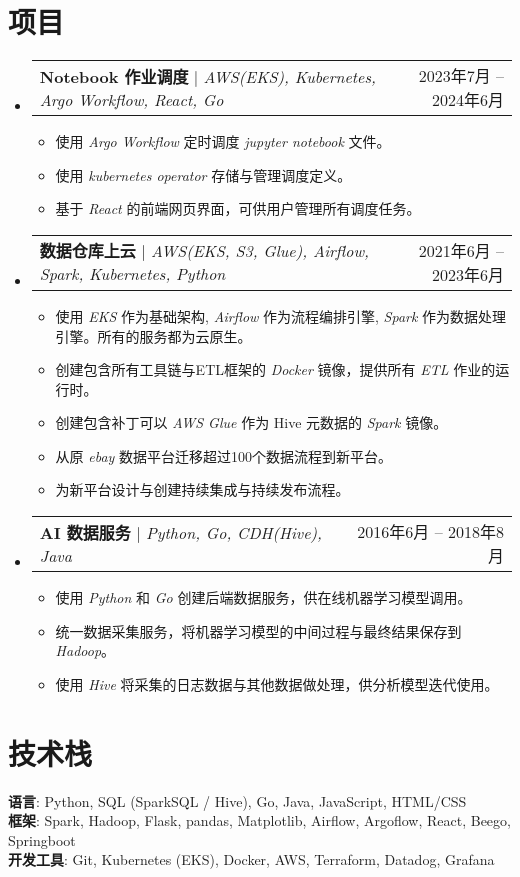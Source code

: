 \documentclass[a4paper,11pt]{article}
\makeatletter
\newcommand{\resumeItem}[1]{
  \item\small{
    {#1 \vspace{-2pt}}
  }
}
\newcommand{\resumeProjectHeading}[2]{
    \item
    \begin{tabular*}{0.97\textwidth}{l@{\extracolsep{\fill}}r}
      \small#1 & #2 \\
    \end{tabular*}\vspace{-7pt}
}
\newcommand{\resumeSubHeadingListStart}{\begin{itemize}[leftmargin=0.15in, label={}]}
\newcommand{\resumeSubHeadingListEnd}{\end{itemize}}
\newcommand{\resumeItemListStart}{\begin{itemize}}
\newcommand{\resumeItemListEnd}{\end{itemize}\vspace{-5pt}}
\makeatother
\begin{document}
\section{项目}
    \resumeSubHeadingListStart
      \resumeProjectHeading
          {\textbf{Notebook 作业调度} $|$ \emph{AWS(EKS), Kubernetes, Argo Workflow, React, Go}}{2023年7月 -- 2024年6月}
          \resumeItemListStart
            \resumeItem{使用 \emph{Argo Workflow} 定时调度 \emph{jupyter notebook} 文件。}
            \resumeItem{使用 \emph{kubernetes operator} 存储与管理调度定义。}
            \resumeItem{基于 \emph{React} 的前端网页界面，可供用户管理所有调度任务。}
          \resumeItemListEnd
      \resumeProjectHeading
          {\textbf{数据仓库上云} $|$ \emph{AWS(EKS, S3, Glue), Airflow, Spark, Kubernetes, Python}}{2021年6月 -- 2023年6月}
          \resumeItemListStart
            \resumeItem{使用 \emph{EKS} 作为基础架构, \emph{Airflow} 作为流程编排引擎, \emph{Spark} 作为数据处理引擎。所有的服务都为云原生。}
            \resumeItem{创建包含所有工具链与ETL框架的 \emph{Docker} 镜像，提供所有 \emph{ETL} 作业的运行时。}
            \resumeItem{创建包含补丁可以 \emph{AWS Glue} 作为 Hive 元数据的 \emph{Spark} 镜像。}
            \resumeItem{从原 \emph{ebay} 数据平台迁移超过100个数据流程到新平台。}
            \resumeItem{为新平台设计与创建持续集成与持续发布流程。}
          \resumeItemListEnd
      \resumeProjectHeading
          {\textbf{AI 数据服务} $|$ \emph{Python, Go, CDH(Hive), Java}}{2016年6月 -- 2018年8月}
          \resumeItemListStart
            \resumeItem{使用 \emph{Python} 和 \emph{Go} 创建后端数据服务，供在线机器学习模型调用。}
            \resumeItem{统一数据采集服务，将机器学习模型的中间过程与最终结果保存到 \emph{Hadoop}。}
            \resumeItem{使用 \emph{Hive} 将采集的日志数据与其他数据做处理，供分析模型迭代使用。}
          \resumeItemListEnd
    \resumeSubHeadingListEnd


%
\section{技术栈}
 \begin{itemize}[leftmargin=0.15in, label={}]
    \small{\item{
     \textbf{语言}{: Python, SQL (SparkSQL / Hive), Go, Java, JavaScript, HTML/CSS} \\
     \textbf{框架}{: Spark, Hadoop, Flask, pandas, Matplotlib, Airflow, Argoflow, React, Beego, Springboot } \\
     \textbf{开发工具}{: Git, Kubernetes (EKS), Docker, AWS, Terraform, Datadog, Grafana} \\
    }}
 \end{itemize}


\end{document}
